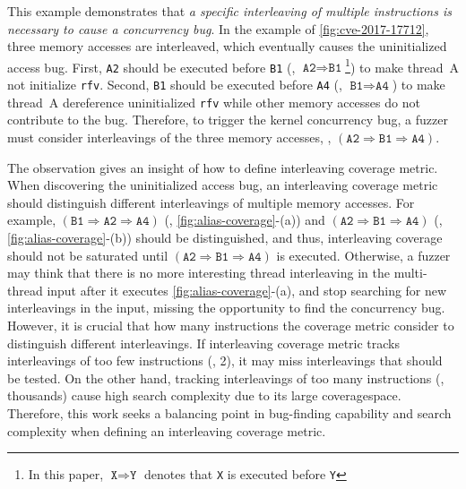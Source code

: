 %
This example demonstrates that \textit{a specific interleaving of
  multiple instructions is necessary to cause a concurrency bug}.
%
In the example of \autoref{fig:cve-2017-17712}, three memory accesses
are interleaved, which eventually causes the uninitialized access bug.
%
First, \texttt{A2} should be executed before \texttt{B1} (\ie,
$\texttt{A2} \Rightarrow \texttt{B1}$\footnote{In this paper,
  $\texttt{X} \Rightarrow \texttt{Y}$ denotes that \texttt{X} is
  executed before \texttt{Y}}) to make thread~A not initialize
\texttt{rfv}.
%
Second, \texttt{B1} should be executed before \texttt{A4} (\ie,
$\texttt{B1} \Rightarrow \texttt{A4}$) to make thread~A dereference
uninitialized \texttt{rfv} while other memory accesses do not
contribute to the bug.
%
Therefore, to trigger the kernel concurrency bug, a fuzzer must
consider interleavings of the three memory accesses, \eg,
$(\texttt{A2} \Rightarrow \texttt{B1} \Rightarrow \texttt{A4})$.


%
The observation gives an insight of how to define interleaving
coverage metric.
%
When discovering the uninitialized access bug, an interleaving
coverage metric should distinguish different interleavings of multiple
memory accesses.
%
For example,
$(\texttt{B1} \Rightarrow \texttt{A2} \Rightarrow \texttt{A4})$ (\ie,
\autoref{fig:alias-coverage}-(a)) and
$(\texttt{A2} \Rightarrow \texttt{B1} \Rightarrow \texttt{A4})$ (\ie,
\autoref{fig:alias-coverage}-(b)) should be distinguished, and thus,
interleaving coverage should not be saturated until
$(\texttt{A2} \Rightarrow \texttt{B1} \Rightarrow \texttt{A4})$ is
executed.
%
Otherwise, a fuzzer may think that there is no more interesting thread
interleaving in the multi-thread input after it executes
\autoref{fig:alias-coverage}-(a), and stop searching for new
interleavings in the input, missing the opportunity to 
find the concurrency bug.
%
However, it is crucial that how many instructions the coverage 
metric consider to distinguish different interleavings.
If interleaving coverage metric tracks interleavings 
of too few instructions (\eg, 2), it may miss interleavings 
that should be tested. On the other hand, tracking interleavings 
of too many instructions (\eg, thousands) cause high search 
complexity due to its large coveragespace.
Therefore, this work seeks a balancing point in bug-finding 
capability and search complexity 
when defining an interleaving coverage metric.

